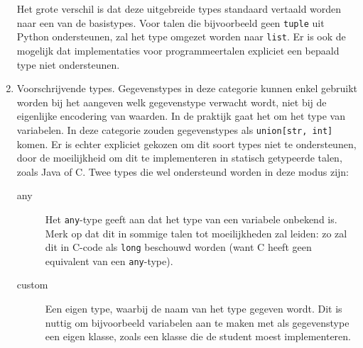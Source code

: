 \begin{enumerate}
    Het grote verschil is dat deze uitgebreide types standaard vertaald worden naar een van de basistypes.
    Voor talen die bijvoorbeeld geen \texttt{tuple} uit Python ondersteunen, zal het type omgezet worden naar \texttt{list}.
    Er is ook de mogelijk dat implementaties voor programmeertalen expliciet een bepaald type niet ondersteunen.
    \item Voorschrijvende types.
    Gegevenstypes in deze categorie kunnen enkel gebruikt worden bij het aangeven welk gegevenstype verwacht wordt, niet bij de eigenlijke encodering van waarden.
    In de praktijk gaat het om het type van variabelen.
    In deze categorie zouden gegevenstypes als \texttt{union[str, int]} komen.
    Er is echter expliciet gekozen om dit soort types niet te ondersteunen, door de moeilijkheid om dit te implementeren in statisch getypeerde talen, zoals Java of C\@.
    Twee types die wel ondersteund worden in deze modus zijn:
    \begin{description}
        \item[any] Het \texttt{any}-type geeft aan dat het type van een variabele onbekend is.
        Merk op dat dit in sommige talen tot moeilijkheden zal leiden: zo zal dit in C-code als \texttt{long} beschouwd worden (want C heeft geen equivalent van een \texttt{any}-type).
        \item[custom] Een eigen type, waarbij de naam van het type gegeven wordt.
        Dit is nuttig om bijvoorbeeld variabelen aan te maken met als gegevenstype een eigen klasse, zoals een klasse die de student moest implementeren.
    \end{description}
\end{enumerate}

